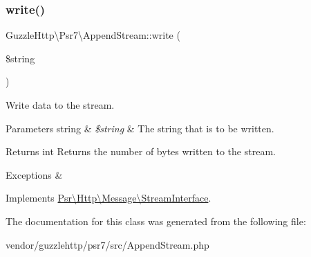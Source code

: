 \subsubsection{\texorpdfstring{write()}{write()}}
{\footnotesize\ttfamily Guzzle\+Http\textbackslash{}\+Psr7\textbackslash{}\+Append\+Stream\+::write (\begin{DoxyParamCaption}\item[{}]{\$string }\end{DoxyParamCaption})}

Write data to the stream.


\begin{DoxyParams}[1]{Parameters}
string & {\em \$string} & The string that is to be written. \\
\hline
\end{DoxyParams}
\begin{DoxyReturn}{Returns}
int Returns the number of bytes written to the stream. 
\end{DoxyReturn}

\begin{DoxyExceptions}{Exceptions}
{\em } & \\
\hline
\end{DoxyExceptions}


Implements \hyperlink{interfacePsr_1_1Http_1_1Message_1_1StreamInterface_aabf9fe3e09f85753834cdb69bbdf3c3d}{Psr\textbackslash{}\+Http\textbackslash{}\+Message\textbackslash{}\+Stream\+Interface}.



The documentation for this class was generated from the following file\+:\begin{DoxyCompactItemize}
\item 
vendor/guzzlehttp/psr7/src/Append\+Stream.\+php\end{DoxyCompactItemize}
